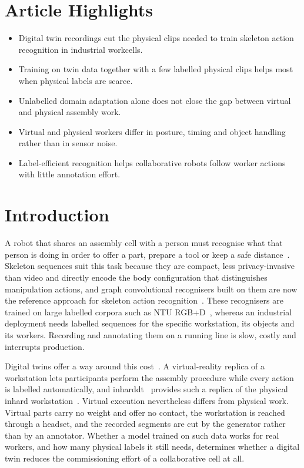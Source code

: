 \documentclass[pdflatex,sn-mathphys-num]{sn-jnl}
\begin{document}
\section*{Article Highlights}
\begin{itemize}
  \item Digital twin recordings cut the physical clips needed to train skeleton action recognition in industrial workcells.
  \item Training on twin data together with a few labelled physical clips helps most when physical labels are scarce.
  \item Unlabelled domain adaptation alone does not close the gap between virtual and physical assembly work.
  \item Virtual and physical workers differ in posture, timing and object handling rather than in sensor noise.
  \item Label-efficient recognition helps collaborative robots follow worker actions with little annotation effort.
\end{itemize}

\section{Introduction}
\label{sec:introduction}

A robot that shares an assembly cell with a person must recognise what that
person is doing in order to offer a part, prepare a tool or keep a safe
distance~\cite{wang2018hrcmotion}. Skeleton sequences suit this task because
they are compact, less privacy-invasive than video and directly encode the body
configuration that distinguishes manipulation actions, and graph convolutional
recognisers built on them are now the reference approach for skeleton action
recognition~\cite{yan2018stgcn,chen2021ctrgcn,liu2025skeletonreview}. These
recognisers are trained on large labelled corpora such as NTU
RGB+D~\cite{shahroudy2016ntu,liu2020ntu120}, whereas an industrial deployment
needs labelled sequences for the specific workstation, its objects and its
workers. Recording and annotating them on a running line is slow, costly and
interrupts production.

Digital twins offer a way around this cost~\cite{tao2019digitaltwin}. A
virtual-reality replica of a workstation lets participants perform the assembly
procedure while every action is labelled automatically, and
\ac{inharddt}~\cite{dallel2023digital} provides such a replica of the physical
\ac{inhard} workstation~\cite{dallel2020inhardpaper}. Virtual execution
nevertheless differs from physical work. Virtual parts carry no weight and
offer no contact, the workstation is reached through a headset, and the
recorded segments are cut by the generator rather than by an annotator. Whether
a model trained on such data works for real workers, and how many physical
labels it still needs, determines whether a digital twin reduces the
commissioning effort of a collaborative cell at all.
\end{document}
